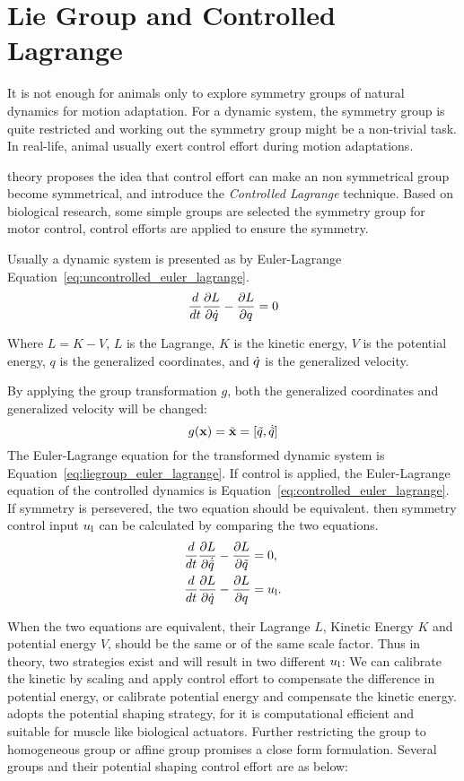 \section{Lie Group and Controlled Lagrange}
\label{sec:liecontrol}
It is not enough for animals  only to  explore symmetry groups of natural dynamics for motion adaptation.
For a dynamic system, the symmetry group is quite restricted and  working out the symmetry group might be a non-trivial task.
In real-life, animal usually exert control effort during motion adaptations.

\moit theory proposes the idea that control effort can make an non symmetrical group become symmetrical, and introduce the \emph{Controlled Lagrange} technique.
Based on biological research\citep{flash2007affine}, some simple groups are selected the symmetry group for motor control,
control efforts are applied to ensure the symmetry.


Usually a dynamic system is presented as by Euler-Lagrange Equation~\ref{eq:uncontrolled_euler_lagrange}\citep{Goldstein2002}.
\begin{equation}
\frac{d}{dt} \frac{\partial L}{\partial \dot{q}} - \frac{\partial L}{\partial q} = 0
\label{eq:uncontrolled_euler_lagrange}
\end{equation}

Where $L=K-V$, $L$ is the Lagrange, $K$ is the kinetic energy, $V$ is the potential energy, $q$ is the generalized coordinates, and $\dot{q}$ is the generalized velocity.

By applying the group transformation $g$, both the generalized coordinates and generalized velocity will be changed:
\[
g(\mathbf{x})=\tilde{\mathbf{x}}=[\tilde{q}, \dot{\tilde{q}}]
\]
The Euler-Lagrange equation for the transformed dynamic system is Equation~\ref{eq:liegroup_euler_lagrange}.
If control is applied, the Euler-Lagrange equation of the controlled dynamics is Equation~\ref{eq:controlled_euler_lagrange}. 
If symmetry is persevered, the two equation should be equivalent.
then symmetry control input $u_{\mathrm{l}}$ can be calculated by comparing the two equations.
\begin{align}
\frac{d}{dt} \frac{\partial L}{\partial \dot{\tilde{q}}} - \frac{\partial L}{\partial \tilde{q} }&=0,\label{eq:liegroup_euler_lagrange}\\
\frac{d}{dt} \frac{\partial L}{\partial \dot{q}} - \frac{\partial L}{\partial q}&=u_{\mathrm{l}}. \label{eq:controlled_euler_lagrange}
\end{align}

When the two equations are equivalent, their Lagrange $L$, Kinetic Energy $K$ and potential energy $V$, should be the same or of the same scale factor.
Thus in theory, two strategies exist and will result in two different $u_{\mathrm{l}}$:
We can calibrate the kinetic by scaling and apply control effort to compensate the difference in potential energy, or calibrate potential energy and compensate the kinetic energy.
\moit adopts the potential shaping strategy, for it is computational efficient and suitable for muscle like biological actuators.
Further restricting the group to homogeneous group or affine group promises a close form formulation.
Several groups and their potential shaping control effort are as below:



